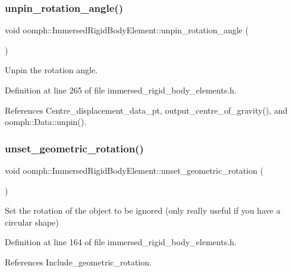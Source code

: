 \subsubsection{\texorpdfstring{unpin\+\_\+rotation\+\_\+angle()}{unpin\_rotation\_angle()}}
{\footnotesize\ttfamily void oomph\+::\+Immersed\+Rigid\+Body\+Element\+::unpin\+\_\+rotation\+\_\+angle (\begin{DoxyParamCaption}{ }\end{DoxyParamCaption})\hspace{0.3cm}{\ttfamily [inline]}}



Unpin the rotation angle. 



Definition at line 265 of file immersed\+\_\+rigid\+\_\+body\+\_\+elements.\+h.



References Centre\+\_\+displacement\+\_\+data\+\_\+pt, output\+\_\+centre\+\_\+of\+\_\+gravity(), and oomph\+::\+Data\+::unpin().

\mbox{\label{classoomph_1_1ImmersedRigidBodyElement_ac1aaf7a8872fa3e02201ed13eb122c59}} 
\subsubsection{\texorpdfstring{unset\+\_\+geometric\+\_\+rotation()}{unset\_geometric\_rotation()}}
{\footnotesize\ttfamily void oomph\+::\+Immersed\+Rigid\+Body\+Element\+::unset\+\_\+geometric\+\_\+rotation (\begin{DoxyParamCaption}{ }\end{DoxyParamCaption})\hspace{0.3cm}{\ttfamily [inline]}}



Set the rotation of the object to be ignored (only really useful if you have a circular shape) 



Definition at line 164 of file immersed\+\_\+rigid\+\_\+body\+\_\+elements.\+h.



References Include\+\_\+geometric\+\_\+rotation.

